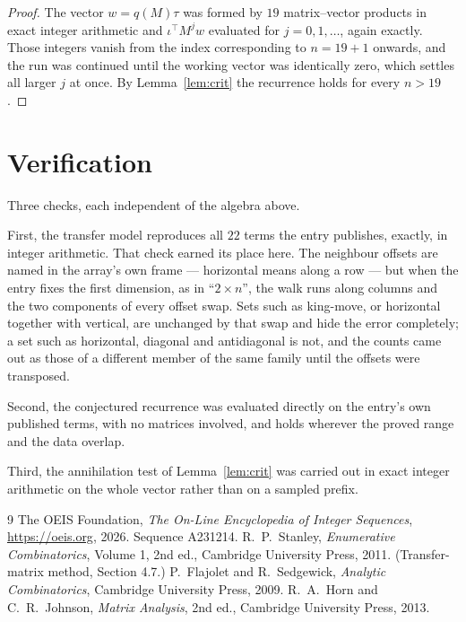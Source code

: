 \documentclass[11pt,a4paper]{article}
\theoremstyle{plain}
\theoremstyle{definition}
\begin{document}
\begin{proof}
The vector $w=q(M)\tau$ was formed by $19$ matrix--vector products in exact integer
arithmetic and $\iota^{\!\top}M^{j}w$ evaluated for $j=0,1,\dots$, again exactly. Those
integers vanish from the index corresponding to $n=19+1$ onwards, and the run was
continued until the working vector was identically zero, which settles all larger $j$ at once.
By Lemma~\ref{lem:crit} the recurrence holds for every $n>19$.
\end{proof}

\section{Verification}

Three checks, each independent of the algebra above.

First, the transfer model reproduces all $22$ terms the entry publishes, exactly, in
integer arithmetic. That check earned its place here. The neighbour offsets are named in the
array's own frame --- horizontal means along a row --- but when the entry fixes the first
dimension, as in ``$2\times n$'', the walk runs along columns and the two components of every
offset swap. Sets such as king-move, or horizontal together with vertical, are unchanged by
that swap and hide the error completely; a set such as horizontal, diagonal and antidiagonal
is not, and the counts came out as those of a different member of the same family until the
offsets were transposed.

Second, the conjectured recurrence was evaluated directly on the entry's own published terms,
with no matrices involved, and holds wherever the proved range and the data overlap.

Third, the annihilation test of Lemma~\ref{lem:crit} was carried out in exact integer
arithmetic on the whole vector rather than on a sampled prefix.

\begin{thebibliography}{9}
 The OEIS Foundation, \emph{The On-Line Encyclopedia of Integer
Sequences}, \url{https://oeis.org}, 2026. Sequence A231214.
 R.~P.~Stanley, \emph{Enumerative Combinatorics}, Volume 1, 2nd ed.,
Cambridge University Press, 2011. (Transfer-matrix method, Section 4.7.)
 P.~Flajolet and R.~Sedgewick, \emph{Analytic Combinatorics}, Cambridge
University Press, 2009.
 R.~A.~Horn and C.~R.~Johnson, \emph{Matrix Analysis}, 2nd ed., Cambridge
University Press, 2013.
\end{thebibliography}
\end{document}
